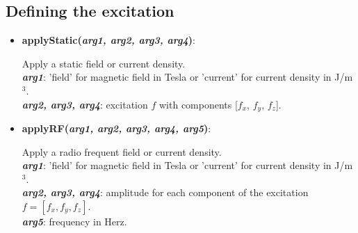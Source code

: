 \subsection{Defining the excitation}

\begin{itemize}

 \item {\textbf{applyStatic(\textit{arg1, arg2, arg3, arg4})}:
				\flushright\parbox{0.9 \textwidth}{\vspace{-0.25cm} 
				Apply a static field or current density.\\
				\textbf{\textit{arg1}}: 'field' for magnetic field in Tesla or 'current' for current density in J/m$^3$.\\
				\textbf{\textit{arg2, arg3, arg4}}: excitation $f$ with components [$f_x$, $f_y$, $f_z$].
				}\flushleft}

 \item {\vspace{-0.4cm}\textbf{applyRF(\textit{arg1, arg2, arg3, arg4, arg5})}:
				\flushright\parbox{0.9 \textwidth}{\vspace{-0.25cm} 
				Apply a radio frequent field or current density.\\
				\textbf{\textit{arg1}}: 'field' for magnetic field in Tesla or 'current' for current density in J/m$^3$.\\
				\textbf{\textit{arg2, arg3, arg4}}: amplitude for each component of the excitation $f = [f_x, f_y, f_z]$.\\
				\textbf{\textit{arg5}}: frequency in Herz.
				}\flushleft}


\end{itemize}
